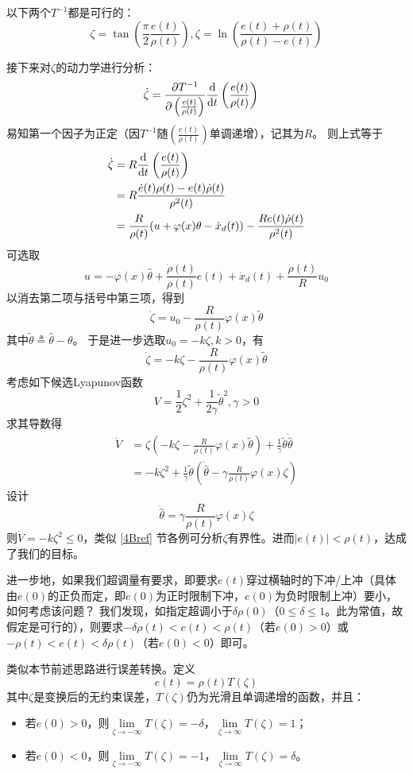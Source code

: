 \begin{example}
    以下两个$T^{-1}$都是可行的：
    \[\zeta = \tan\left(\frac{\pi}{2}\frac{e(t)}{\rho(t)}\right),\zeta = \ln\left(\frac{e(t)+\rho(t)}{\rho(t)-e(t)}\right)\]
\end{example}

接下来对$\zeta$的动力学进行分析：
\begin{align*}
    \dot{\zeta} &= \frac{\partial T^{-1}}{\partial \left(\frac{e(t)}{\rho(t)}\right)}
    \frac{\mathop{}\!\mathrm{d}}{\mathop{}\!\mathrm{d} t}\left(\frac{e(t)}{\rho(t)}\right)
\end{align*}
易知第一个因子为正定（因$T^{-1}$随$\left(\frac{e(t)}{\rho(t)}\right)$单调递增），记其为$R$。
则上式等于
\begin{align*}
    \dot{\zeta} &= R
    \frac{\mathop{}\!\mathrm{d}}{\mathop{}\!\mathrm{d} t}\left(\frac{e(t)}{\rho(t)}\right)\\
    &=R\frac{\dot{e}(t)\rho(t)-e(t)\dot{\rho}(t)}{\rho^2(t)}\\
    &=\frac{R}{\rho(t)}(u+\varphi(x)\theta-\dot{x}_d(t))-\frac{Re(t)\dot{\rho}(t)}{\rho^2(t)}
\end{align*}
可选取\[u=-\varphi(x)\hat{\theta}+\frac{\dot{\rho}(t)}{\rho(t)}e(t)+\dot{x}_d(t)+\frac{\rho(t)}{R}u_0\]
以消去第二项与括号中第三项，得到
\[\dot{\zeta} = u_0-\frac{R}{\rho(t)}\varphi(x)\tilde{\theta}\]
其中$\tilde{\theta}\triangleq \hat{\theta}-\theta$。
于是进一步选取$u_0=-k\zeta,k>0$，有
\[\dot{\zeta} = -k\zeta-\frac{R}{\rho(t)}\varphi(x)\tilde{\theta}\]
考虑如下候选Lyapunov函数
\[V=\frac{1}{2}\zeta^2+\frac{1}{2\gamma}\tilde{\theta}^2,\gamma>0\]
求其导数得\begin{align*}
    \dot{V}&=\zeta\left(-k\zeta-\frac{R}{\rho(t)}\varphi(x)\tilde{\theta}\right)+\frac{1}{\gamma}\tilde{\theta}\dot{\hat{\theta}}\\
    &=-k\zeta^2+\frac{1}{\gamma}\tilde{\theta}\left(\dot{\hat{\theta}}-\gamma \frac{R}{\rho(t)}\varphi(x)\zeta\right)
\end{align*}
设计\[\dot{\hat{\theta}}=\gamma \frac{R}{\rho(t)}\varphi(x)\zeta\]
则$\dot{V}=-k\zeta^2\le 0$，类似 \ref{4Bref} 节各例可分析$\zeta$有界性。进而$|e(t)|<\rho(t)$，达成了我们的目标。

进一步地，如果我们超调量有要求，即要求$e(t)$穿过横轴时的下冲/上冲（具体由$e(0)$的正负而定，即$e(0)$为正时限制下冲，$e(0)$为负时限制上冲）要小，如何考虑该问题？
我们发现，如指定超调小于$\delta\rho(0)$（$0\le\delta\le 1$。此为常值，故假定是可行的），则要求$-\delta\rho(t)<e(t)<\rho(t)$（若$e(0)>0$）或$-\rho(t)<e(t)<\delta\rho(t)$（若$e(0)<0$）即可。

类似本节前述思路进行误差转换。定义\[e(t)=\rho(t)T(\zeta)\]
其中$\zeta$是变换后的无约束误差，$T(\zeta)$仍为光滑且单调递增的函数，并且：
\begin{itemize}[leftmargin=1em]
    \item 若$e(0)>0$，则$\lim\limits_{\zeta\to-\infty}T(\zeta)=-\delta$，$\lim\limits_{\zeta\to\infty}T(\zeta)=1$；
    \item 若$e(0)<0$，则$\lim\limits_{\zeta\to-\infty}T(\zeta)=-1$，$\lim\limits_{\zeta\to\infty}T(\zeta)=\delta$。
\end{itemize}

